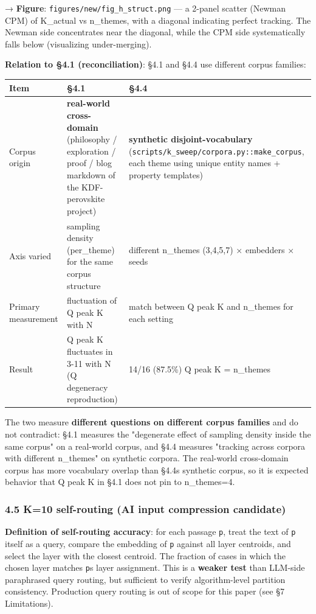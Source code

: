\documentclass[
]{article}
\newcounter{none} %
\begin{document}
→ \textbf{Figure}: \texttt{figures/new/fig\_h\_struct.png} --- a 2-panel
scatter (Newman \textbar{} CPM) of K\_actual vs n\_themes, with a
diagonal indicating perfect tracking. The Newman side concentrates near
the diagonal, while the CPM side systematically falls below (visualizing
under-merging).

\textbf{Relation to §4.1 (reconciliation)}: §4.1 and §4.4 use different
corpus families:

{\def\LTcaptype{none} %
\begin{longtable}[]{@{}lll@{}}
\toprule\noalign{}
Item & §4.1 & §4.4 \\
\midrule\noalign{}
\endhead
\bottomrule\noalign{}
\endlastfoot
Corpus origin & \textbf{real-world cross-domain} (philosophy /
exploration / proof / blog markdown of the KDF-perovskite project) &
\textbf{synthetic disjoint-vocabulary}
(\texttt{scripts/k\_sweep/corpora.py::make\_corpus}, each theme using
unique entity names + property templates) \\
Axis varied & sampling density (per\_theme) for the same corpus
structure & different n\_themes (3,4,5,7) × embedders × seeds \\
Primary measurement & fluctuation of Q peak K with N & match between Q
peak K and n\_themes for each setting \\
Result & Q peak K fluctuates in 3-11 with N (Q degeneracy reproduction)
& 14/16 (87.5\%) Q peak K = n\_themes \\
\end{longtable}
}

The two measure \textbf{different questions on different corpus
families} and do not contradict: §4.1 measures the "degenerate effect of
sampling density inside the same corpus" on a real-world corpus, and
§4.4 measures "tracking across corpora with different n\_themes" on
synthetic corpora. The real-world cross-domain corpus has more
vocabulary overlap than §4.4\textquotesingle s synthetic corpus, so it
is expected behavior that Q peak K in §4.1 does not pin to n\_themes=4.

\subsubsection{4.5 K=10 self-routing (AI input compression
candidate)}\label{45-k10-self-routing-ai-input-compression-candidate}

\textbf{Definition of self-routing accuracy}: for each passage
\texttt{p}, treat the text of \texttt{p} itself as a query, compare the
embedding of \texttt{p} against all layer centroids, and select the
layer with the closest centroid. The fraction of cases in which the
chosen layer matches \texttt{p}\textquotesingle s layer assignment. This
is a \textbf{weaker test} than LLM-side paraphrased query routing, but
sufficient to verify algorithm-level partition consistency. Production
query routing is out of scope for this paper (see §7 Limitations).
\end{document}
